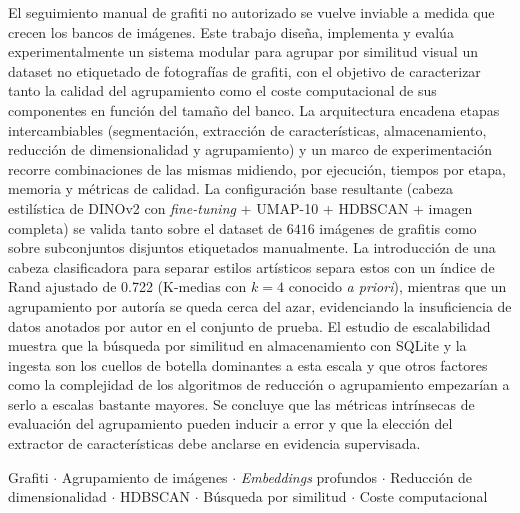 
El seguimiento manual de grafiti no autorizado se vuelve inviable a medida que
crecen los bancos de imágenes. Este trabajo diseña, implementa y evalúa
experimentalmente un sistema modular para agrupar por similitud visual un
dataset no etiquetado de fotografías de grafiti, con el objetivo de
caracterizar tanto la calidad del agrupamiento como el coste computacional de
sus componentes en función del tamaño del banco. La arquitectura encadena
etapas intercambiables (segmentación, extracción de características,
almacenamiento, reducción de dimensionalidad y agrupamiento) y un marco de
experimentación recorre combinaciones de las mismas midiendo, por ejecución,
tiempos por etapa, memoria y métricas de calidad. La configuración base
resultante (cabeza estilística de DINOv2 con \textit{fine-tuning} + UMAP-10 +
HDBSCAN + imagen completa) se valida tanto sobre el dataset de $6416$ imágenes
de grafitis como sobre subconjuntos disjuntos etiquetados manualmente. La
introducción de una cabeza clasificadora para separar estilos artísticos separa
estos con un índice de Rand ajustado de 0.722 (K-medias con $k{=}4$ conocido
\textit{a priori}), mientras que un agrupamiento por autoría se queda cerca del
azar, evidenciando la insuficiencia de datos anotados por autor en el conjunto
de prueba. El estudio de escalabilidad muestra que la búsqueda por similitud en
almacenamiento con SQLite y la ingesta son los cuellos de botella dominantes a
esta escala y que otros factores como la complejidad de los algoritmos de
reducción o agrupamiento empezarían a serlo a escalas bastante mayores. Se
concluye que las métricas intrínsecas de evaluación del agrupamiento pueden
inducir a error y que la elección del extractor de características debe
anclarse en evidencia supervisada.

\keywordname{} Grafiti $\cdot$ Agrupamiento de imágenes $\cdot$
\textit{Embeddings} profundos $\cdot$ Reducción de dimensionalidad $\cdot$
HDBSCAN $\cdot$ Búsqueda por similitud $\cdot$ Coste computacional
